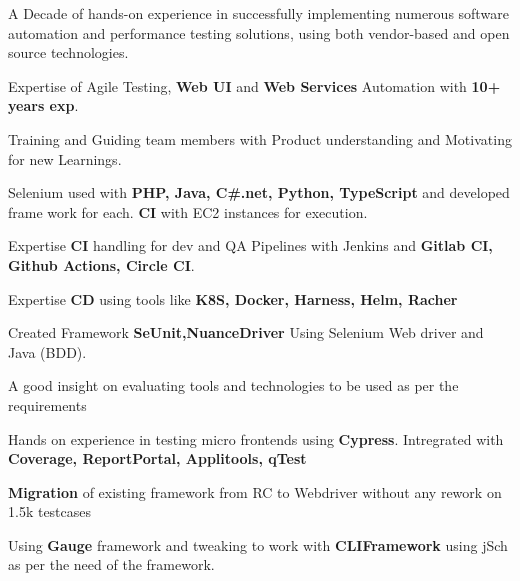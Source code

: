 

\begin{cventries}
\begin{cvitemize}
 \item {A Decade of hands-on experience in successfully implementing numerous software automation and performance testing solutions, using both vendor-based and open source technologies.}
 \item {Expertise of Agile Testing, \textbf{Web UI} and \textbf{Web Services} Automation with \textbf{10+ years exp}.}
 \item {Training and Guiding team members with Product understanding and Motivating for new Learnings.}
 \item {Selenium used with \textbf{PHP, Java, C\#.net, Python, TypeScript} and developed frame work for each. \textbf{CI} with EC2 instances for execution.}
 
 \item {Expertise \textbf{CI} handling for dev and QA Pipelines with Jenkins and \textbf{Gitlab CI, Github Actions, Circle CI}}.
 
 \item {Expertise \textbf{CD} using tools like \textbf{K8S, Docker, Harness, Helm, Racher}}

 \item {Created Framework \textbf{SeUnit,NuanceDriver} Using Selenium Web driver and Java (BDD).}
 
 \item {A good insight on evaluating tools and technologies to be used as per the requirements}
 
 \item {Hands on experience in testing micro frontends using \textbf{Cypress}. Intregrated with \textbf{Coverage, ReportPortal, Applitools, qTest}} 

 \item {\textbf{Migration} of existing framework from RC to Webdriver without any rework on 1.5k testcases}

 \item {Using \textbf{Gauge} framework and tweaking to work with \textbf{CLIFramework} using jSch as per the need of the framework.}


\end{cvitemize}
\end{cventries}
